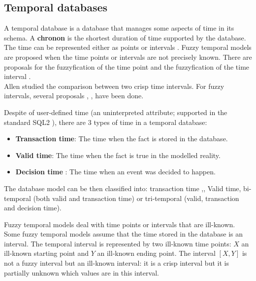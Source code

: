 \subsection{Temporal databases}
A temporal database \cite{Dyreson1994} is a database that manages some aspects of time in its schema. A \textbf{chronon} is the shortest duration of time supported by the database. The time can be represented either as points or intervals \cite{655777}. Fuzzy temporal models \cite{4481150} are proposed when the time points or intervals are not precisely known. There are proposals for the  fuzzyfication of the time point \cite{Dubois89} and the fuzzyfication of the time interval \cite{Garrido2009}.\\
Allen \cite{Allen:1983:MKT:182.358434} studied the comparison between two crisp time intervals. For fuzzy intervals, several proposals \cite{4481150}, \cite{springerlink:10.1007/978-3-540-39964-3_57},\cite{10.1109/TIME.2004.1314418} have been done.




Despite of user-defined time (an uninterpreted attribute; supported in the standard SQL2 \cite{Mel93}), there are 3 types of time in a temporal database:

\begin{itemize}
	\item
	\textbf{Transaction time}: The time when the fact is stored in the database.
	\item
	\textbf{Valid time}: The time when the fact is true in the modelled reality.
	\item
	\textbf{Decision time} \cite{Nascimento95decisiontime}: The time when an event was decided to happen. 
	\end{itemize}
	
	 The  database model can be then classified into: transaction time \cite{Ston87},\cite{Jensen:1991:IIM:627283.627484}, Valid time, bi-temporal \cite{Snodgrass:1984:TQL:588011.588041}(both valid and transaction time) or tri-temporal \cite{Nascimento95decisiontime} (valid, transaction and decision time).

Fuzzy temporal models \cite{4481150} deal with time points \cite{Dubois89} or intervals \cite{Garrido2009} that are ill-known. Some fuzzy temporal models assume that the time stored in the database is an interval. The temporal interval is represented by two ill-known time points: $X$  an ill-known starting point and $Y$ an ill-known ending point. The interval $\left[X,Y\right]$ is not a fuzzy interval but an ill-known interval: it is a crisp interval but it is partially unknown which values are in this interval.
